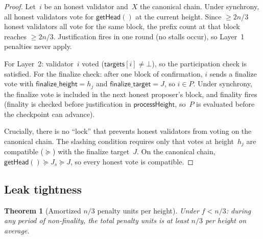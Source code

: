 \ifx\litemode\undefined\documentclass{article}\fi
\newcommand{\targets}{\mathsf{targets}}
\newcommand{\finalizetarget}{\mathsf{finalize\_target}}
\newcommand{\finalizeheight}{\mathsf{finalize\_height}}
\theoremstyle{plain}
\newtheorem{theorem}{Theorem}
\theoremstyle{definition}
\theoremstyle{remark}
\begin{document}
\begin{proof}
Let~$i$ be an honest validator and~$X$ the canonical chain.
Under synchrony, all honest validators vote for $\textsf{getHead}()$ at the current height.
Since $\geq 2n/3$ honest validators all vote for the same block, the prefix count at that block reaches $\geq 2n/3$.
Justification fires in one round (no stalls occur), so Layer~1 penalties never apply.

For Layer~2: validator~$i$ voted ($\targets[i] \neq \bot$), so the participation check is satisfied.
For the finalize check: after one block of confirmation, $i$ sends a finalize vote with $\finalizeheight = h_j$ and $\finalizetarget = J$, so $i \in P$.
Under synchrony, the finalize vote is included in the next honest proposer's block, and finality fires (finality is checked before justification in $\textsf{processHeight}$, so~$P$ is evaluated before the checkpoint can advance).

Crucially, there is no ``lock'' that prevents honest validators from voting on the canonical chain.
The slashing condition requires only that votes at height~$h_j$ are compatible ($\succeq$) with the finalize target~$J$.
On the canonical chain, $\textsf{getHead}() \succeq J_s \succeq J$, so every honest vote is compatible.
\end{proof}

\subsection{Leak tightness}

\begin{theorem}[Amortized $n/3$ penalty units per height]\label{thm:tightness}
Under $f < n/3$: during any period of non-finality, the total penalty units is at least $n/3$ per height on average.
\end{theorem}
\end{document}
